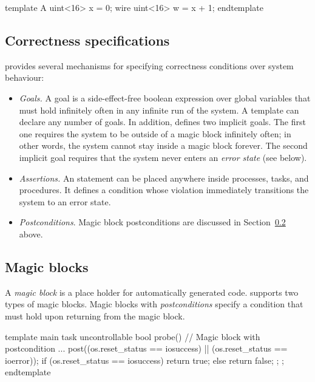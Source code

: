 \begin{tsllisting2}
template A
  uint<16> x = 0;
  wire uint<16> w = x + 1;
endtemplate
\end{tsllisting2}


\subsection{Correctness specifications}\label{s:o:correctness}

\tsl provides several mechanisms for specifying correctness 
conditions over system behaviour:
\begin{itemize}
    \item \emph{Goals.} A goal is a side-effect-free boolean 
        expression over global variables that must hold infinitely 
        often in any infinite run of the system.  A template can 
        declare any number of goals.  In addition, \tsl defines 
        two implicit goals.  The first one requires the system to 
        be outside of a magic block infinitely often; in other 
        words, the system cannot stay inside a magic block 
        forever.  The second implicit goal requires that the 
        system never enters an \emph{error state} (see below).
    \item \emph{Assertions.}  An  statement can be 
        placed anywhere inside processes, tasks, and procedures.  
        It defines a condition whose violation immediately 
        transitions the system to an error state.
    \item \emph{Postconditions}.  Magic block postconditions are 
        discussed in Section~\ref{s:o:magic} above.
\end{itemize}



\subsection{Magic blocks}\label{s:o:magic}

A \emph{magic block} is a place holder for automatically generated 
code.  \tsl supports two types of magic blocks.  Magic blocks with 
\emph{postconditions} specify a condition that must hold upon 
returning from the magic block.  


\begin{tsllisting2}
template main
  task uncontrollable bool probe() {
    // Magic block with postcondition
    {...} post((os.reset_status == iosuccess) ||
               (os.reset_status == ioerror));
    if (os.reset_status == iosuccess) {
      return true;
    } else {
      return false;
    };
};
endtemplate
\end{tsllisting2}

